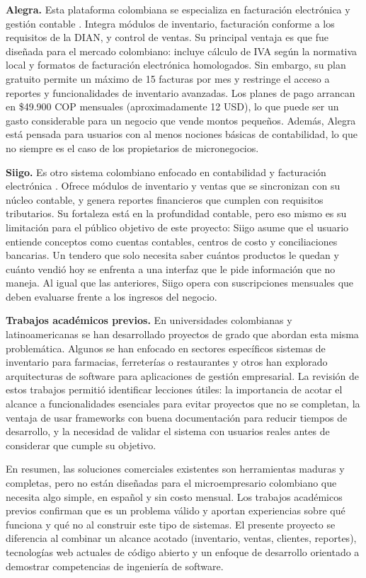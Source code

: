 \documentclass[spanish]{ieee_upb}
\begin{document}
\textbf{Alegra.} Esta plataforma colombiana se especializa en facturación electrónica y gestión contable \cite{alegra}. Integra módulos de inventario, facturación conforme a los requisitos de la DIAN, y control de ventas. Su principal ventaja es que fue diseñada para el mercado colombiano: incluye cálculo de IVA según la normativa local y formatos de facturación electrónica homologados. Sin embargo, su plan gratuito permite un máximo de 15 facturas por mes y restringe el acceso a reportes y funcionalidades de inventario avanzadas. Los planes de pago arrancan en \$49.900 COP mensuales (aproximadamente 12 USD), lo que puede ser un gasto considerable para un negocio que vende montos pequeños. Además, Alegra está pensada para usuarios con al menos nociones básicas de contabilidad, lo que no siempre es el caso de los propietarios de micronegocios.

\textbf{Siigo.} Es otro sistema colombiano enfocado en contabilidad y facturación electrónica \cite{siigo}. Ofrece módulos de inventario y ventas que se sincronizan con su núcleo contable, y genera reportes financieros que cumplen con requisitos tributarios. Su fortaleza está en la profundidad contable, pero eso mismo es su limitación para el público objetivo de este proyecto: Siigo asume que el usuario entiende conceptos como cuentas contables, centros de costo y conciliaciones bancarias. Un tendero que solo necesita saber cuántos productos le quedan y cuánto vendió hoy se enfrenta a una interfaz que le pide información que no maneja. Al igual que las anteriores, Siigo opera con suscripciones mensuales que deben evaluarse frente a los ingresos del negocio.

\textbf{Trabajos académicos previos.} En universidades colombianas y latinoamericanas se han desarrollado proyectos de grado que abordan esta misma problemática. Algunos se han enfocado en sectores específicos sistemas de inventario para farmacias, ferreterías o restaurantes  y otros han explorado arquitecturas de software para aplicaciones de gestión empresarial. La revisión de estos trabajos permitió identificar lecciones útiles: la importancia de acotar el alcance a funcionalidades esenciales para evitar proyectos que no se completan, la ventaja de usar frameworks con buena documentación para reducir tiempos de desarrollo, y la necesidad de validar el sistema con usuarios reales antes de considerar que cumple su objetivo.

En resumen, las soluciones comerciales existentes son herramientas maduras y completas, pero no están diseñadas para el microempresario colombiano que necesita algo simple, en español y sin costo mensual. Los trabajos académicos previos confirman que es un problema válido y aportan experiencias sobre qué funciona y qué no al construir este tipo de sistemas. El presente proyecto se diferencia al combinar un alcance acotado (inventario, ventas, clientes, reportes), tecnologías web actuales de código abierto y un enfoque de desarrollo orientado a demostrar competencias de ingeniería de software.
\end{document}
